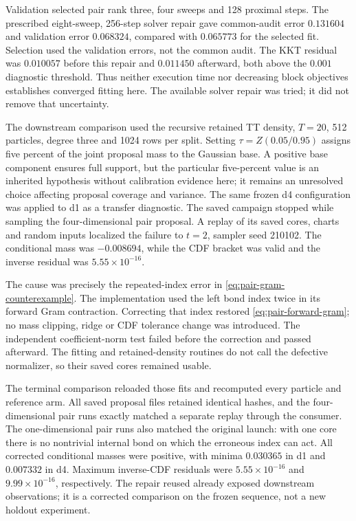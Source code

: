 \documentclass[11pt]{article}
\begin{document}
Validation selected pair rank three, four sweeps and 128 proximal steps.
The prescribed eight-sweep, 256-step solver repair gave common-audit error
$0.131604$ and validation error $0.068324$, compared with $0.065773$ for
the selected fit. Selection used the validation errors, not the common audit.
The KKT residual was $0.010057$ before this repair and $0.011450$ afterward,
both above the $0.001$ diagnostic threshold. Thus neither execution time nor
decreasing block objectives establishes converged fitting here. The available
solver repair was tried; it did not remove that uncertainty.

The downstream comparison used the recursive retained TT density, $T=20$,
512 particles, degree three and 1024 rows per split. Setting
$\tau=Z(0.05/0.95)$ assigns five percent of the joint proposal mass to the
Gaussian base. A positive base component ensures full support, but the
particular five-percent value is an inherited hypothesis without calibration
evidence here; it remains an unresolved choice affecting proposal coverage
and variance. The same frozen d4 configuration was applied to d1 as a transfer
diagnostic. The saved campaign stopped while sampling the four-dimensional
pair proposal. A replay of its
saved cores, charts and random inputs localized the failure to $t=2$, sampler
seed 210102. The conditional mass was $-0.008694$, while the CDF bracket was
valid and the inverse residual was $5.55\times10^{-16}$.

The cause was precisely the repeated-index error in
\eqref{eq:pair-gram-counterexample}. The implementation used the left bond
index twice in its forward Gram contraction. Correcting that index restored
\eqref{eq:pair-forward-gram}; no mass clipping, ridge or CDF tolerance change
was introduced. The independent coefficient-norm test failed before the
correction and passed afterward. The fitting and retained-density routines
do not call the defective normalizer, so their saved cores remained usable.

The terminal comparison reloaded those fits and recomputed every particle and
reference arm. All saved proposal files retained identical hashes, and the
four-dimensional pair runs exactly matched a separate replay through the
consumer. The one-dimensional pair runs also matched the original launch:
with one core there is no nontrivial internal bond on which the erroneous
index can act. All corrected conditional masses were positive, with minima
$0.030365$ in d1 and $0.007332$ in d4. Maximum inverse-CDF residuals were
$5.55\times10^{-16}$ and $9.99\times10^{-16}$, respectively.
The repair reused already exposed downstream observations; it is a corrected
comparison on the frozen sequence, not a new holdout experiment.
\end{document}
